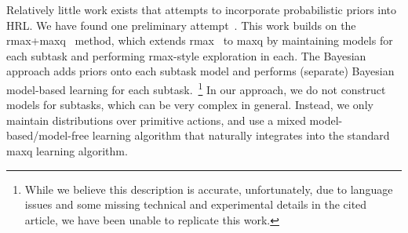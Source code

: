 Relatively little work exists that attempts to incorporate
probabilistic priors into HRL. We have found one preliminary
attempt~\cite{Zhao-bhrl-2010}. This work builds on the {\sc
  rmax+maxq}~\cite{rmax-maxq} method, which extends {\sc
  rmax}~\cite{Brafman01r-max} to {\sc maxq} by maintaining models for
each subtask and performing {\sc rmax}-style exploration in each. The
Bayesian approach adds priors onto each subtask model and performs
(separate) Bayesian model-based learning for each
subtask.~\footnote{While we believe this description is accurate,
  unfortunately, due to language issues and some missing technical and
  experimental details in the cited article, we have been unable to
  replicate this work.} In our approach, we do not construct models
for subtasks, which can be very complex in general.  Instead, we only
maintain distributions over primitive actions, and use a mixed
model-based/model-free learning algorithm that naturally integrates
into the standard {\sc maxq} learning algorithm. 
